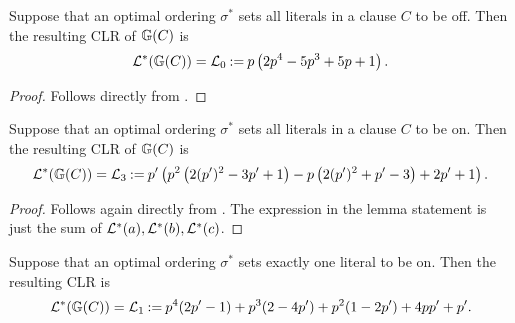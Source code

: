 \begin{lemma}\label{lemma:bayesian_000CLR} 
    Suppose that an optimal ordering $\sigma^*$ sets all literals in a clause $ C $ to be off. Then the resulting CLR of $ \mathbb{G}\!\left(C\right) $ is \[
        \mathcal{L}^* (\mathbb{G}\!\left(C\right)) = \mathcal{L}_0 \mathbin{:=} p \left(2 p^4-5 p^3+5 p+1\right).
     \]
\end{lemma}

\begin{proof}
    Follows directly from .
\end{proof}

\begin{lemma}
    \label{lemma:bayesian_111CLR}
    Suppose that an optimal ordering $\sigma^*$ sets all literals in a clause $ C $ to be on. Then the resulting CLR of $ \mathbb{G}\!\left(C\right) $ is \begin{align*}
        \mathcal{L}^*(\mathbb{G}\!\left(C\right)) = \mathcal{L}_3 \mathbin{:=} p' \left(p^2 \left(2 (p')^2-3 p'+1\right)-p \left(2 (p')^2+p'-3\right)+2 p'+1\right).
     \end{align*}
\end{lemma}

\begin{proof}
    Follows again directly from .
    The expression in the lemma statement is just the sum of $ \mathcal{L}^*(a),\mathcal{L}^*(b),\mathcal{L}^*(c) $.
\end{proof}

\begin{lemma}
    \label{lemma:bayesian_100CLR}
    Suppose that an optimal ordering $\sigma^*$ sets exactly one literal to be on. Then the resulting CLR is \[
        \mathcal{L}^*(\mathbb{G}\!\left(C\right)) =\mathcal{L}_1 \mathbin{:=} p^4 (2 p'-1)+p^3 (2-4 p')+p^2 (1-2 p')+4 p p'+p'.
     \]
\end{lemma}

